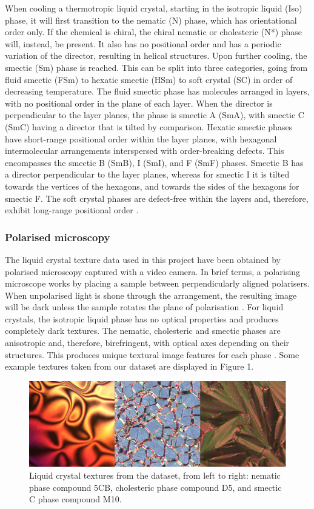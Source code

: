 \documentclass[12pt]{article}
\begin{document}
When cooling a thermotropic liquid crystal, starting in the isotropic liquid (Iso) phase, it will first transition to the nematic (N) phase, which has orientational order only. If the chemical is chiral, the chiral nematic or cholesteric (N*) phase will, instead, be present. It also has no positional order and has a periodic variation of the director, resulting in helical structures. Upon further cooling, the smectic (Sm) phase is reached. This can be split into three categories, going from fluid smectic (FSm) to hexatic smectic (HSm) to soft crystal (SC) in order of decreasing temperature. The fluid smectic phase has molecules arranged in layers, with no positional order in the plane of each layer. When the director is perpendicular to the layer planes, the phase is smectic A (SmA), with smectic C (SmC) having a director that is tilted by comparison. Hexatic smectic phases have short-range positional order within the layer planes, with hexagonal intermolecular arrangements interspersed with order-breaking defects. This encompasses the smectic B (SmB), I (SmI), and F (SmF) phases. Smectic B has a director perpendicular to the layer planes, whereas for smectic I it is tilted towards the vertices of the hexagons, and towards the sides of the hexagons for smectic F. The soft crystal phases are defect-free within the layers and, therefore, exhibit long-range positional order \cite{Dierking03}.
\subsubsection{Polarised microscopy}
The liquid crystal texture data used in this project have been obtained by polarised microscopy captured with a video camera. In brief terms, a polarising microscope works by placing a sample between perpendicularly aligned polarisers. When unpolarised light is shone through the arrangement, the resulting image will be dark unless the sample rotates the plane of polarisation \cite{Dierking03}. For liquid crystals, the isotropic liquid phase has no optical properties and produces completely dark textures. The nematic, cholesteric and smectic phases are anisotropic and, therefore, birefringent, with optical axes depending on their structures. This produces unique textural image features for each phase \cite{Dierking03}. Some example textures taken from our dataset are displayed in Figure 1.

\begin{figure}[!htb]
\centering
\includegraphics[width=6in]{images/texture_samples.png}
\caption{Liquid crystal textures from the dataset, from left to right: nematic phase compound 5CB, cholesteric phase compound D5, and smectic C phase compound M10.}
\end{figure}
\end{document}
